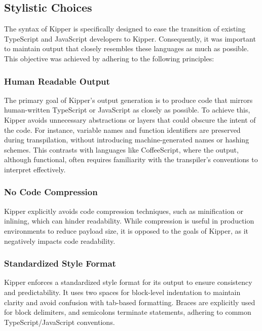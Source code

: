 \subsection{Stylistic Choices}

The syntax of Kipper is specifically designed to ease the transition of existing TypeScript and JavaScript developers to Kipper. Consequently, it was important to maintain output that closely resembles these languages as much as possible. This objective was achieved by adhering to the following principles:

\subsubsection{Human Readable Output}

The primary goal of Kipper's output generation is to produce code that mirrors human-written TypeScript or JavaScript as closely as possible. To achieve this, Kipper avoids unnecessary abstractions or layers that could obscure the intent of the code. For instance, variable names and function identifiers are preserved during \gls{transpilation}, without introducing machine-generated names or hashing schemes. This contrasts with languages like CoffeeScript, where the output, although functional, often requires familiarity with the \gls{transpiler}'s conventions to interpret effectively.

\subsubsection{No Code Compression}

Kipper explicitly avoids code compression techniques, such as minification or inlining, which can hinder readability. While compression is useful in production environments to reduce payload size, it is opposed to the goals of Kipper, as it negatively impacts code readability.

\subsubsection{Standardized Style Format}

Kipper enforces a standardized style format for its output to ensure consistency and predictability. It uses two spaces for block-level indentation to maintain clarity and avoid confusion with tab-based formatting. Braces are explicitly used for block delimiters, and semicolons terminate statements, adhering to common TypeScript/JavaScript conventions.

